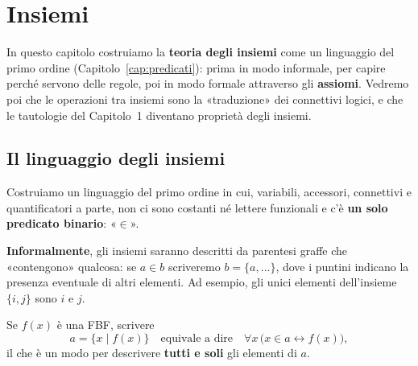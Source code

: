 \chapter{Insiemi}\label{cap:insiemi}

In questo capitolo costruiamo la \textbf{teoria degli insiemi} come un linguaggio del primo ordine
(Capitolo~\ref{cap:predicati}): prima in modo informale, per capire perché servono delle regole, poi in modo
formale attraverso gli \textbf{assiomi}. Vedremo poi che le operazioni tra insiemi sono la «traduzione» dei
connettivi logici, e che le tautologie del Capitolo~1 diventano proprietà degli insiemi.

\section{Il linguaggio degli insiemi}\label{sec:linguaggio-insiemi}

Costruiamo un linguaggio del primo ordine in cui, variabili, accessori, connettivi e quantificatori a parte,
non ci sono costanti né lettere funzionali e c'è \textbf{un solo predicato binario}: «$\in$».


\textbf{Informalmente}, gli insiemi saranno descritti da parentesi graffe che «contengono» qualcosa: se $a \in b$
scriveremo $b = \{a, \dots\}$, dove i puntini indicano la presenza eventuale di altri elementi.
Ad esempio, gli unici elementi dell'insieme $\{i, j\}$ sono $i$ e $j$.

Se $f(x)$ è una FBF, scrivere
\[ a = \{x \mid f(x)\} \quad \text{equivale a dire} \quad \forall x\,\big(x \in a \leftrightarrow f(x)\big), \]
il che è un modo per descrivere \textbf{tutti e soli} gli elementi di $a$.


